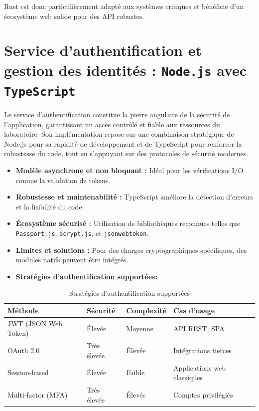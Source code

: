 \documentclass[12pt]{rapportPfe}
\begin{document}
Rust est donc particulièrement adapté aux systèmes critiques et bénéficie d’un écosystème web solide pour des API robustes.

\section{Service d’authentification et gestion des identités : \texttt{Node.js} avec \texttt{TypeScript}}

Le service d'authentification constitue la pierre angulaire de la sécurité de l'application, garantissant un accès contrôlé et fiable aux ressources du laboratoire. Son implémentation repose sur une combinaison stratégique de Node.js pour sa rapidité de développement et de TypeScript pour renforcer la robustesse du code, tout en s'appuyant sur des protocoles de sécurité modernes.

\begin{itemize}
    \item \textbf{Modèle asynchrone et non bloquant :} Idéal pour les vérifications I/O comme la validation de tokens.
    \item \textbf{Robustesse et maintenabilité :} TypeScript améliore la détection d’erreurs et la lisibilité du code.
    \item \textbf{Écosystème sécurisé :} Utilisation de bibliothèques reconnues telles que \texttt{Passport.js}, \texttt{bcrypt.js}, et \texttt{jsonwebtoken}.
    \item \textbf{Limites et solutions :} Pour des charges cryptographiques spécifiques, des modules natifs peuvent être intégrés.
    \item \textbf{Stratégies d'authentification supportées:}
\end{itemize}

\begin{table}[ht]
\centering
\begin{tabular}{| >{\raggedright\arraybackslash}p{4cm} 
                | >{\raggedright\arraybackslash}p{3cm} 
                | >{\raggedright\arraybackslash}p{3cm} 
                | >{\raggedright\arraybackslash}p{5cm} |}
\hline
\textbf{Méthode} & \textbf{Sécurité} & \textbf{Complexité} & \textbf{Cas d'usage} \\
\hline
JWT (JSON Web Token) & Élevée & Moyenne & API REST, SPA \\
\hline
OAuth 2.0 & Très élevée & Élevée & Intégrations tierces \\
\hline
Session-based & Élevée & Faible & Applications web classiques \\
\hline
Multi-factor (MFA) & Très élevée & Élevée & Comptes privilégiés \\
\hline
\end{tabular}
\caption{Stratégies d'authentification supportées}
\label{tab:auth-aupported}
\end{table}
\end{document}
